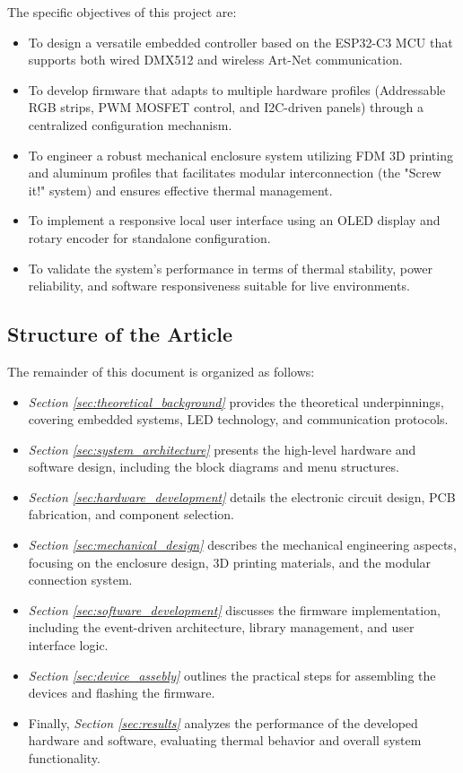 The specific objectives of this project are:
\begin{itemize}
	\item To design a versatile embedded controller based on the ESP32-C3 \ac{MCU} that supports both wired DMX512 and wireless Art-Net communication.
	\item To develop firmware that adapts to multiple hardware profiles (Addressable \ac{RGB} strips, \ac{PWM} \ac{MOSFET} control, and \ac{I2C}-driven panels) through a centralized configuration mechanism.
	\item To engineer a robust mechanical enclosure system utilizing \ac{FDM} 3D printing and aluminum profiles that facilitates modular interconnection (the "Screw it!" system) and ensures effective thermal management.
	\item To implement a responsive local user interface using an \ac{OLED} display and rotary encoder for standalone configuration.
	\item To validate the system's performance in terms of thermal stability, power reliability, and software responsiveness suitable for live environments.
\end{itemize}

\subsection{Structure of the Article}
The remainder of this document is organized as follows:
\begin{itemize}
	\item \textit{Section \ref{sec:theoretical_background} } provides the theoretical underpinnings, covering embedded systems, \ac{LED} technology, and communication protocols.
	\item \textit{Section \ref{sec:system_architecture} } presents the high-level hardware and software design, including the block diagrams and menu structures.
	\item \textit{Section \ref{sec:hardware_development} } details the electronic circuit design, \ac{PCB} fabrication, and component selection.
	\item \textit{Section \ref{sec:mechanical_design} } describes the mechanical engineering aspects, focusing on the enclosure design, 3D printing materials, and the modular connection system.
	\item \textit{Section \ref{sec:software_development} } discusses the firmware implementation, including the event-driven architecture, library management, and user interface logic.
	\item \textit{Section \ref{sec:device_assebly} } outlines the practical steps for assembling the devices and flashing the firmware.
	\item Finally, \textit{Section \ref{sec:results} } analyzes the performance of the developed hardware and software, evaluating thermal behavior and overall system functionality.
\end{itemize}